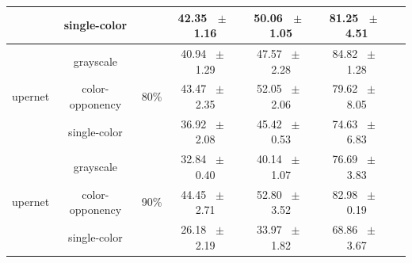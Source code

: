 \begin{table}[h]
\begin{tabular}{@{}lccc ccc@{}}
    & single-color & & 42.35 ~$\pm$~ 1.16 & 50.06 ~$\pm$~ 1.05 & 81.25 ~$\pm$~ 4.51 \\
    \midrule
    \multirow{3}{*}{upernet} & grayscale & \multirow{3}{*}{80\%} & 40.94 ~$\pm$~ 1.29 & 47.57 ~$\pm$~ 2.28 & 84.82 ~$\pm$~ 1.28 \\
    & color-opponency & & 43.47 ~$\pm$~ 2.35 & 52.05 ~$\pm$~ 2.06 & 79.62 ~$\pm$~ 8.05 \\
    & single-color & & 36.92 ~$\pm$~ 2.08 & 45.42 ~$\pm$~ 0.53 & 74.63 ~$\pm$~ 6.83 \\
    \midrule
    \multirow{3}{*}{upernet} & grayscale & \multirow{3}{*}{90\%} & 32.84 ~$\pm$~ 0.40 & 40.14 ~$\pm$~ 1.07 & 76.69 ~$\pm$~ 3.83 \\
    & color-opponency & & 44.45 ~$\pm$~ 2.71 & 52.80 ~$\pm$~ 3.52 & 82.98 ~$\pm$~ 0.19 \\
    & single-color & & 26.18 ~$\pm$~ 2.19 & 33.97 ~$\pm$~ 1.82 & 68.86 ~$\pm$~ 3.67 \\
    \midrule
    \bottomrule
  \end{tabular}
  \label{tab:sparse_upernet_acdc_fog}
\end{table}